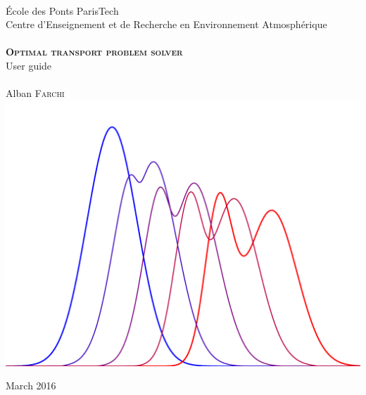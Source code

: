     \begin{center}

        \HRule \\[0.5cm]

        \footnotesize
        \'Ecole des Ponts ParisTech\\
        Centre d'Enseignement et de Recherche en Environnement Atmosphérique\\[0.5cm]

        \HRule \\[1.5cm]

        \Large
        \textsc{\bfseries{Optimal transport problem solver}}\\[0.5cm]

        \normalsize
        User guide\\[1.5cm]

        \HRule \\[1.5cm]

        Alban \textsc{Farchi}\\[1.5cm]

        \includegraphics[scale=0.5]{./logos/ot}

        \vfill

        \footnotesize
        March 2016
    \end{center}

